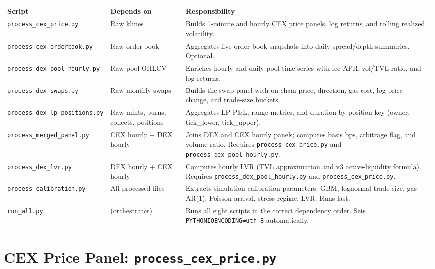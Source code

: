 \documentclass[11pt,a4paper]{article}
\begin{document}
\begin{xltabular}{\linewidth}{L{5.5cm}L{2.5cm}Y}
\toprule
\textbf{Script} & \textbf{Depends on} & \textbf{Responsibility} \\
\midrule
\texttt{process\_cex\_price.py} & Raw klines & Builds 1-minute and hourly
  CEX price panels, log returns, and rolling realized volatility. \\
\addlinespace
\texttt{process\_cex\_orderbook.py} & Raw order-book & Aggregates live
  order-book snapshots into daily spread/depth summaries. Optional. \\
\addlinespace
\texttt{process\_dex\_pool\_hourly.py} & Raw pool OHLCV & Enriches hourly
  and daily pool time series with fee APR, vol/TVL ratio, and log returns. \\
\addlinespace
\texttt{process\_dex\_swaps.py} & Raw monthly swaps & Builds the swap panel
  with on-chain price, direction, gas cost, log price change, and trade-size
  buckets. \\
\addlinespace
\texttt{process\_dex\_lp\_positions.py} & Raw mints, burns, collects,
  positions & Aggregates LP P\&L, range metrics, and duration by position
  key (owner, tick\_lower, tick\_upper). \\
\addlinespace
\texttt{process\_merged\_panel.py} & CEX hourly + DEX hourly & Joins DEX
  and CEX hourly panels; computes basis bps, arbitrage flag, and volume ratio.
  Requires \texttt{process\_cex\_price.py} and
  \texttt{process\_dex\_pool\_hourly.py}. \\
\addlinespace
\texttt{process\_dex\_lvr.py} & DEX hourly + CEX hourly & Computes hourly
  LVR (TVL approximation and v3 active-liquidity formula). Requires
  \texttt{process\_dex\_pool\_hourly.py} and
  \texttt{process\_cex\_price.py}. \\
\addlinespace
\texttt{process\_calibration.py} & All processed files & Extracts
  simulation calibration parameters: GBM, lognormal trade-size,
  gas AR(1), Poisson arrival, stress regime, LVR. Runs last. \\
\addlinespace
\texttt{run\_all.py} & (orchestrator) & Runs all eight scripts in the
  correct dependency order. Sets \texttt{PYTHONIOENCODING=utf-8}
  automatically. \\
\bottomrule
\end{xltabular}

\section{CEX Price Panel: \texttt{process\_cex\_price.py}}
\label{sec:cexprice}
\end{document}
